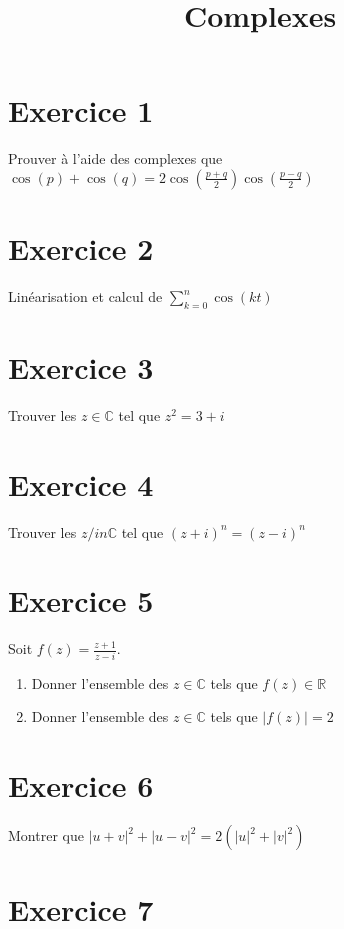 \documentclass[11pt]{article}
\author{\Name \texttt{\Login}}
\date{}
\title{Complexes}
\begin{document}
\maketitle

\section*{Exercice 1}

Prouver à l'aide des complexes que $\cos(p) +\cos(q)=2\cos(\frac{p+q}{2})\cos(\frac{p-q}{2})$

\section*{Exercice 2}

Linéarisation et calcul de $\sum_{k=0}^n \cos(kt)$

\section*{Exercice 3}

Trouver les $z\in\mathbb{C}$ tel que $z^2=3+i$

\section*{Exercice 4}

Trouver les $z/in\mathbb{C}$ tel que $(z+i)^n=(z-i)^n$

\section*{Exercice 5}

Soit $f(z)=\frac{z+1}{z-i}$.

\begin{enumerate}
\item Donner l'ensemble des $z\in\mathbb{C}$ tels que $f(z)\in\mathbb{R}$
\item Donner l'ensemble des $z\in\mathbb{C}$ tels que $|f(z)|=2$
\end{enumerate}

\section*{Exercice 6}

Montrer que $|u+v|^2 +|u-v|^2 = 2(|u|^2 + |v|^2)$ 

\section*{Exercice 7}
\end{document}
